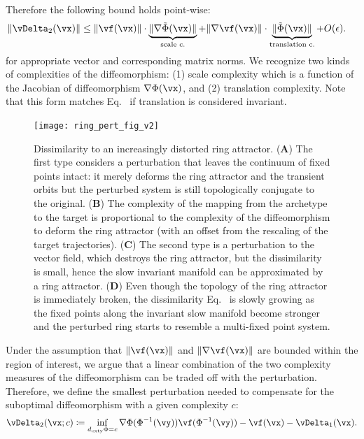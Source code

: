 \documentclass{article}
\theoremstyle{definition} \newtheorem{definition}{Definition}  \newtheorem{example}{Example}
\theoremstyle{remark} \newtheorem{remark}{Remark}
\renewcommand{\eqref}{Eq.~\originaleqref}
\newcounter{ct}
\DeclarePairedDelimiter{\norm}{\lVert}{\rVert}
\newcommand{\inv}{^{-1}}
\newcommand{\dcomplexity}{\ensuremath{d_\text{cxty}}}
\newcommand{\homeo}{\Phi} %
\newcommand{\invhomeo}{\homeo\inv}
\begin{document}
Therefore the following bound holds point-wise:
\begin{align}
    \norm{\vDelta_2(\vx)}
    &\leq
	\norm{\vf(\vx)}
	\cdot
	\underbrace{
	    \norm{\nabla\tilde\homeo(\vx)}
	}_{\substack{\text{scale c.}}}
	+
	\norm{\nabla\vf(\vx)}
	\cdot
	\underbrace{
	\norm{\tilde\homeo(\vx)}
	}_{\substack{\text{translation c.}}}
	+ O(\epsilon).
    \label{eq:h:bound}
\end{align}
for appropriate vector and corresponding matrix norms.
We recognize two kinds of complexities of the diffeomorphism: (1) scale complexity which is a function of the Jacobian of diffeomorphism $\nabla\homeo(\vx)$, and (2) translation complexity.
Note that this form matches \eqref{eq:dcomplexity} if translation is considered invariant.

\begin{figure}[t!bhp]
    \centering
    \texttt{[image: ring\_pert\_fig\_v2]}
    \caption{Dissimilarity to an increasingly distorted ring attractor. %
    (\textbf{A}) The first type considers a perturbation that leaves the continuum of fixed points intact: it merely deforms the ring attractor and the transient orbits but the perturbed system is still topologically conjugate to the original. 
    (\textbf{B}) The complexity of the mapping from the archetype to the target is proportional to the complexity of the diffeomorphism to deform the ring attractor (with an offset from the rescaling of the target trajectories).
    (\textbf{C}) The second type is a perturbation to the vector field, which destroys the ring attractor, but the dissimilarity is small, hence the slow invariant manifold can be approximated by a ring attractor.
    (\textbf{D}) Even though the topology of the ring attractor is immediately broken, the dissimilarity \eqref{eq:loss} is slowly growing as the fixed points along the invariant slow manifold become stronger and the perturbed ring starts to resemble a multi-fixed point system.
    }
    \label{fig:ring_pert_fig}
\end{figure}

Under the assumption that $\norm{\vf(\vx)}$ and $\norm{\nabla\vf(\vx)}$ are bounded within the region of interest, we argue that a linear combination of the two complexity measures of the diffeomorphism can be traded off with the perturbation.
Therefore, we define the smallest perturbation needed to compensate for the suboptimal diffeomorphism with a given complexity $c$:
\begin{align}
    \vDelta_2(\vx ; c) \coloneqq \inf_{\dcomplexity{\homeo} = c}
	\nabla\homeo(\invhomeo(\vy)) \vf(\invhomeo(\vy))
	- \vf(\vx) - \vDelta_1(\vx).
\end{align}
\end{document}
